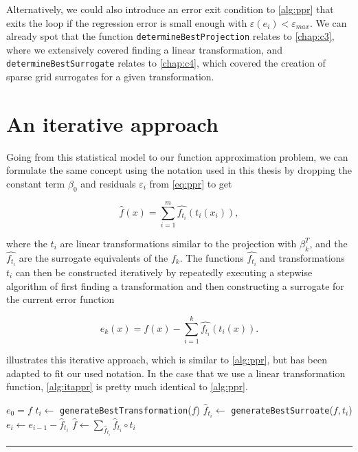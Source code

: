 \documentclass[
  a4paper,  %
  twoside,  %
  bibliography=totoc,
  headsepline,
  cleardoublepage=empty,
  parskip=half,
  draft=false
]{scrbook}
\newcommand{\delimit}{{\color{silver}\noindent\rule{\textwidth}{1pt}}}
\begin{document}
Alternatively, we could also introduce an error exit condition to \cref{alg:ppr} that exits the loop if the regression error is small enough with $\varepsilon(e_i) < \varepsilon_{max}$.
We can already spot that the function \texttt{determineBestProjection} relates to \cref{chap:c3}, where we extensively covered finding a linear transformation, and \texttt{determineBestSurrogate} relates to \cref{chap:c4}, which covered the creation of sparse grid surrogates for a given transformation.

\section{An iterative approach}

Going from this statistical model to our function approximation problem, we can formulate the same concept using the notation used in this thesis by dropping the constant term $\beta_0$ and residuals $\varepsilon_i$ from \cref{eq:ppr} to get

\begin{equation}
\hat{f}(x)=\sum_{i=1}^m \hat{f_{t_i}}(t_i(x_i)),
\nonumber
\end{equation}

where the $t_i$ are linear transformations similar to the projection with $\beta_k^T$, and the $\hat{f_{t_i}}$ are the surrogate equivalents of the $f_k$.
The functions $\hat{f_{t_i}}$ and transformations $t_i$ can then be constructed iteratively by repeatedly executing a stepwise algorithm of first finding a transformation and then constructing a surrogate for the current error function

\begin{equation}
e_k(x)=f(x) - \sum_{i=1}^k \hat{f_{t_i}}(t_i(x)).
\nonumber
\end{equation}

 illustrates this iterative approach, which is similar to \cref{alg:ppr}, but has been adapted to fit our used notation.
In the case that we use a linear transformation function, \cref{alg:itappr} is pretty much identical to \cref{alg:ppr}.

\begin{mdframed}[style=algstyle,frametitle={\textbf{function} \texttt{transformedSurrogateSum}{$(f, i_{\text{max}})$}}]
\normalsize
\vspace{5.5mm}
\begin{algorithmic}[1]
    \State $e_0 = f$
    	\State $t_i \gets$ \texttt{generateBestTransformation}($f$)
    	\State $\hat{f}_{t_i} \gets$ \texttt{generateBestSurroate}($f, t_i$)
    	\State $e_i \gets e_{i - 1} - \hat{f}_{t_i}$
    \EndFor
    \State $\hat{f} \gets \sum_{\hat{f}_{t_i}} \hat{f}_{t_i} \circ t_i$
    \State {}
\end{algorithmic}
\vspace{-1.5mm}
\delimit
	\label{alg:itappr}
\end{mdframed}
\end{document}
